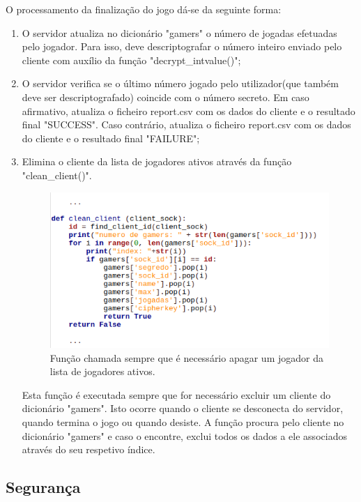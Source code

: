 \documentclass{report}
\begin{document}
O processamento da finalização do jogo dá-se da seguinte forma: 
\begin{enumerate}
\item O servidor atualiza no dicionário "gamers" o número de jogadas efetuadas pelo jogador. Para isso, deve descriptografar o número inteiro enviado pelo cliente com auxílio da função "decrypt\_intvalue()";
\item O servidor verifica se o último número jogado pelo utilizador(que também deve ser descriptografado) coincide com o número secreto.
Em caso afirmativo, atualiza o ficheiro report.csv com os dados do cliente e o resultado final "SUCCESS". Caso contrário, atualiza o ficheiro report.csv com os dados do cliente e o resultado final "FAILURE";
\item Elimina o cliente da lista de jogadores ativos através da função "clean\_client()".

\begin{figure}[H]
        \centering
        \includegraphics[scale=0.65]{clean_client}      
        \caption{Função chamada sempre que é necessário apagar um jogador da lista de jogadores ativos.}
\end{figure}
Esta função é executada sempre que for necessário excluir um cliente do dicionário "gamers". Isto ocorre quando o cliente se desconecta do servidor, quando termina o jogo ou quando desiste.
A função procura pelo cliente no dicionário "gamers" e caso o encontre, exclui todos os dados a ele associados através do seu respetivo índice.
\end{enumerate}

\subsection{Segurança}
\end{document}
